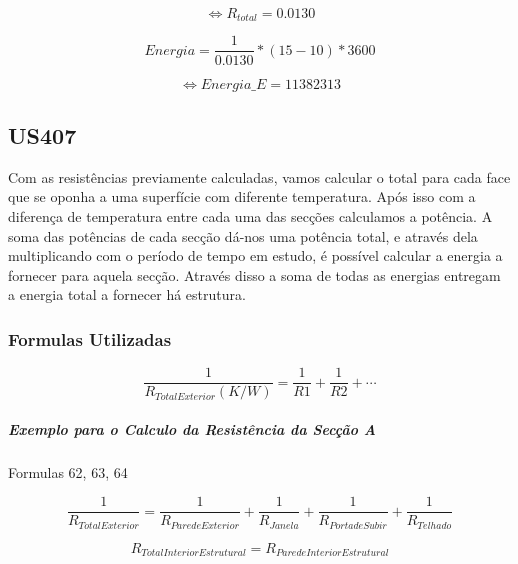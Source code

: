\documentclass[12pt, a4paper]{article}
\begin{document}
\begin{equation}
	\Leftrightarrow R_{total} =
	{0.0130}
	\label{eq:totalE2}
\end{equation}

\begin{equation}
	Energia =
	\dfrac{1}{0.0130} *
	\left( {15-10} \right) *
	3600
	\label{eq:energiaE}
\end{equation}

\begin{equation}
	\Leftrightarrow Energia\_E =
	11382313
	\label{eq:energiaE1}
\end{equation}

\pagebreak
\subsection{US407}\label{sec:US407}
Com as resistências previamente calculadas, vamos calcular o total para cada face que se oponha a uma superfície com diferente temperatura. Após isso com a diferença de temperatura entre cada uma das secções calculamos a potência. A soma das potências de cada secção dá-nos uma potência total, e através dela multiplicando com o período de tempo em estudo, é possível calcular a energia a fornecer para aquela secção. Através disso a soma de todas as energias entregam a energia total a fornecer há estrutura.
\vspace{10mm}
\subsubsection{Formulas Utilizadas}

\begin{equation}
	\dfrac{1}{R_{TotalExterior}(K/W)} =
	\dfrac{1}{R1} +
	\dfrac{1}{R2} +
    \cdots
	\label{eq:US407formula10}
\end{equation}

\subparagraph{Exemplo para o Calculo da Resistência da Secção A}
Formulas 62, 63, 64

\begin{equation}
	\dfrac{1}{R_{TotalExterior}} =
	\dfrac{1}{R_{Parede Exterior}} +
	\dfrac{1}{R_{Janela}} +
	\dfrac{1}{R_{Porta de Subir}} +
	\dfrac{1}{R_{Telhado}}
	\label{eq:US407formula1}
\end{equation}

\begin{equation}
	R_{TotalInteriorEstrutural} =
	R_{Parede Interior Estrutural}
	\label{eq:US407formula2}
\end{equation}
\end{document}
